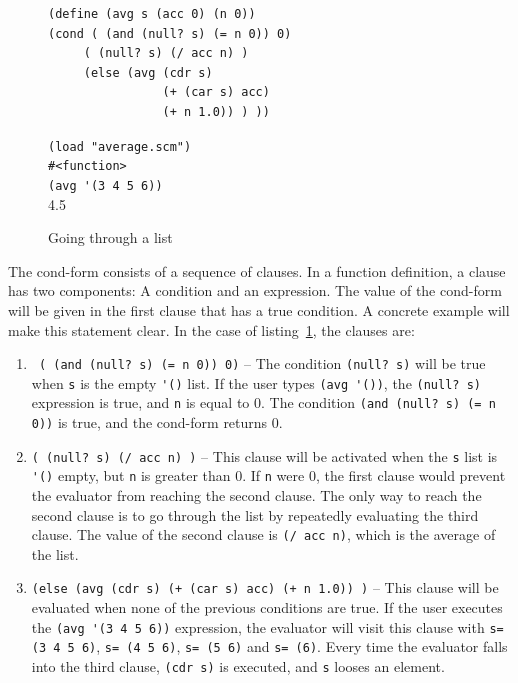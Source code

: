 \documentclass[a4paper,12pt]{book}
\newenvironment{fmpage}[1]
           {\begin{lrbox}{\fmbox}\begin{minipage}{#1}}
           {\end{minipage}\end{lrbox}\fbox{\usebox{\fmbox}}}
\begin{document}
\begin{figure}[!h]
\begin{fmpage}{0.9\textwidth}
\begin{verbatim}
(define (avg s (acc 0) (n 0))
(cond ( (and (null? s) (= n 0)) 0)
     ( (null? s) (/ acc n) )
     (else (avg (cdr s) 
                (+ (car s) acc) 
                (+ n 1.0)) ) ))
\end{verbatim}
\end{fmpage}

\begin{fmpage}{0.9\textwidth}
\verb|(load "average.scm")|\\
\verb|#<function>|\\
\verb|(avg '(3 4 5 6))|\\
4.5
\end{fmpage}
\caption{Going through a list}
\label{going-through-a-list}
\end{figure}

The cond-form consists of a sequence
of clauses. In a function definition,
a clause has two components: A condition
and an expression. The value of the
cond-form will be given in the first
clause that has a true condition.
A concrete example will make this
statement clear. In the case of
listing~\ref{going-through-a-list},
the clauses are:
\begin{enumerate}
\item \verb| ( (and (null? s) (= n 0)) 0)| --
The condition \verb|(null? s)| will be true
when \verb|s| is the empty \verb|'()| list.
If the user types \verb|(avg '())|,
the \verb|(null? s)| expression is true, and \verb|n| is
equal to 0. The condition
\verb|(and (null? s) (= n 0))| is true, and the cond-form
returns 0.
\item \verb|( (null? s) (/ acc n) )| -- This clause
will be activated when the \verb|s| list is
\verb|'()| empty, but \verb|n| is greater than
0. If \verb|n| were 0, the first clause
would prevent the evaluator from
reaching the second clause. The only
way to reach the second clause is to go through
the list by repeatedly evaluating the third clause.
The value of the second clause is \verb|(/ acc n)|,
which is the average of the list.
\item \verb|(else (avg (cdr s) (+ (car s) acc) (+ n 1.0)) )| --
This clause will be evaluated
when none of the previous conditions are true.
If the user executes the \verb|(avg '(3 4 5 6))|
expression, the evaluator will visit this
clause with \verb|s= (3 4 5 6)|, \verb|s= (4 5 6)|,
\verb|s= (5 6)| and \verb|s= (6)|.
Every time the evaluator falls into the third
clause, \verb|(cdr s)| is executed, and \verb|s|
looses an element.
\end{enumerate}
\end{document}
